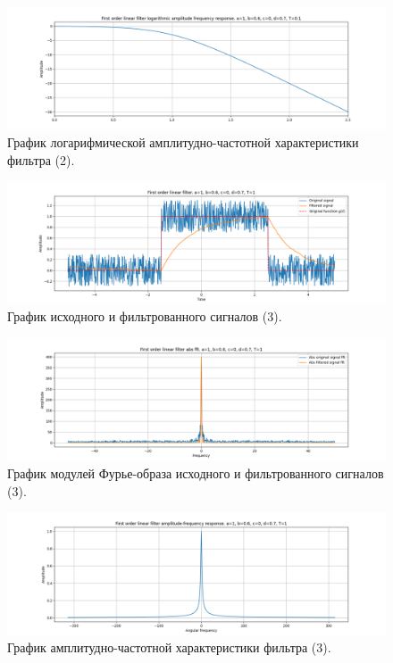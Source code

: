 \documentclass[a4paper, 12pt]{article}
\begin{document}
    \begin{figure}[H]
        \centering
        \includegraphics[scale=0.4]{2_lafr_filtered_linear.png}
        \captionsetup{skip=0pt}
        \caption{График логарифмической амплитудно-частотной характеристики фильтра (2).}
        \label{fig:filinlafr11}
    \end{figure}
    \begin{figure}[H]
        \centering
        \includegraphics[scale=0.4]{3_filtered_linear.png}
        \captionsetup{skip=0pt}
        \caption{График исходного и фильтрованного сигналов (3).}
        \label{fig:filin13}
    \end{figure}
    \begin{figure}[H]
        \centering
        \includegraphics[scale=0.4]{3_abs_filtered_linear.png}
        \captionsetup{skip=0pt}
        \caption{График модулей Фурье-образа исходного и фильтрованного сигналов (3).}
        \label{fig:filinabs13}
    \end{figure}
    \begin{figure}[H]
        \centering
        \includegraphics[scale=0.4]{3_afr_filtered_linear.png}
        \captionsetup{skip=0pt}
        \caption{График амплитудно-частотной характеристики фильтра (3).}
        \label{fig:filinafr13}
    \end{figure}
\end{document}
